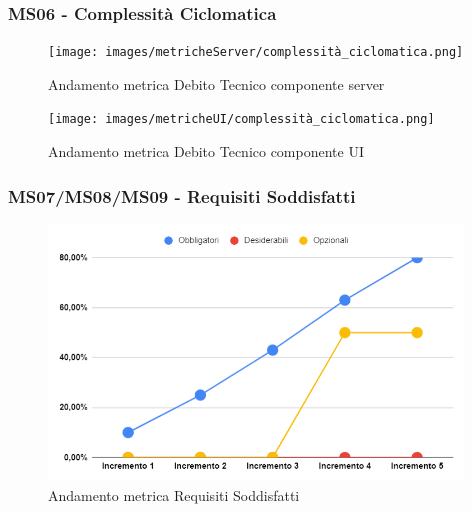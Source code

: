 \subsubsection{MS06 - Complessità Ciclomatica}
\begin{figure}[H]
	\centering
	\texttt{[image: images/metricheServer/complessità\_ciclomatica.png]}
	\caption{Andamento metrica Debito Tecnico componente server}
\end{figure}
\begin{figure}[H]
	\centering
	\texttt{[image: images/metricheUI/complessità\_ciclomatica.png]}
	\caption{Andamento metrica Debito Tecnico componente UI}
\end{figure}

\subsubsection{MS07/MS08/MS09 - Requisiti Soddisfatti}
\begin{figure}[H]
	\centering
	\includegraphics[width=11cm]{images/requisiti_soddisfatti.png}
	\caption{Andamento metrica Requisiti Soddisfatti}
\end{figure}


